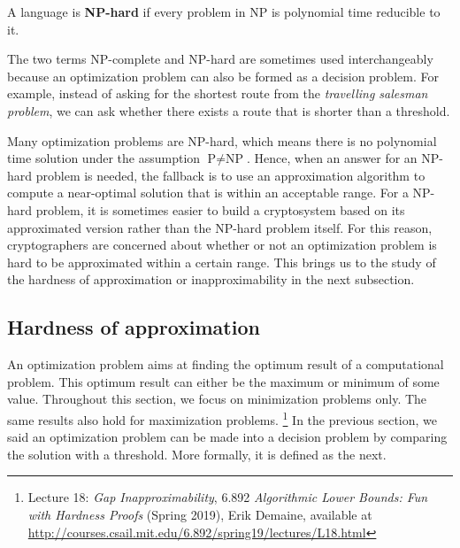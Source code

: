 \documentclass[../main.tex]{subfiles}
\begin{document}
\begin{definition}
A language is \textbf{NP-hard} 
\reversemarginpar
{}
if every problem in NP is polynomial time reducible to it. 
\end{definition}
 
The two terms NP-complete and NP-hard are sometimes used  interchangeably because an optimization problem can also be formed as a decision problem. For example, instead of asking for the shortest route from the \textit{travelling salesman problem}, we can ask whether there exists a route that is shorter than a threshold. 

Many optimization problems are NP-hard, which means there is no polynomial time solution under the assumption $\text{P}\neq \text{NP}$. Hence, when an answer for an NP-hard problem is needed, the fallback is to use an approximation algorithm to compute a near-optimal solution that is within an acceptable range. 
For a NP-hard problem, it is sometimes easier to build a cryptosystem based on its approximated version rather than the NP-hard problem itself. For this reason, cryptographers are concerned about whether or not an optimization problem is hard to be approximated within a certain range. %
This brings us to the study of the hardness of approximation or inapproximability in the next subsection. 

\subsection{Hardness of approximation}
\label{subsection:gapProb}

An optimization problem aims at finding the optimum result of a computational problem. This optimum result can either be the maximum or minimum of some value. Throughout this section, we focus on minimization problems only. The same results also hold for maximization problems. \footnote{Lecture 18: \textit{Gap Inapproximability}, 6.892 \textit{Algorithmic Lower Bounds: Fun with Hardness Proofs} (Spring 2019), Erik Demaine, available at
 \url{http://courses.csail.mit.edu/6.892/spring19/lectures/L18.html}} 
In the previous section, we said an optimization problem can be made into a decision problem by comparing the solution with a threshold. More formally, it is defined as the next. 
\end{document}
